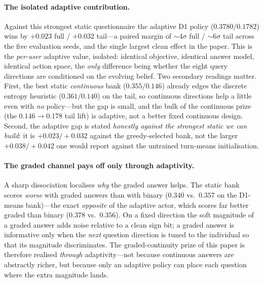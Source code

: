 \documentclass[11pt]{article}
\begin{document}
\paragraph{The isolated adaptive contribution.} Against this strongest static questionnaire the adaptive D1 policy
($0.3780/0.1782$) wins by $+0.023$ full / $+0.032$ tail---a paired margin of ${\sim}4\sigma$ full / ${\sim}6\sigma$ tail
across the five evaluation seeds, and the single largest clean effect in the paper. This is the \emph{per-user} adaptive
value, isolated: identical objective, identical answer model, identical action space, the \emph{only} difference being
whether the eight query directions are conditioned on the evolving belief. Two secondary readings matter. First, the best
static \emph{continuous} bank ($0.355/0.146$) already edges the discrete entropy heuristic ($0.361/0.140$) on the tail,
so continuous directions help a little even with \emph{no} policy---but the gap is small, and the bulk of the continuous
prize (the $0.146\!\to\!0.178$ tail lift) is adaptive, not a better fixed continuous design. Second, the adaptive gap is
stated \emph{honestly against the strongest static we can build}: it is $+0.023/+0.032$ against the greedy-selected bank,
not the larger $+0.038/+0.042$ one would report against the untrained turn-means initialisation.

\paragraph{The graded channel pays off only through adaptivity.} A sharp dissociation localises \emph{why} the graded
answer helps. The static bank scores \emph{worse} with graded answers than with binary ($0.340$ vs.\ $0.357$ on the
D1-means bank)---the exact \emph{opposite} of the adaptive actor, which scores far better graded than binary
($0.378$ vs.\ $0.356$). On a fixed direction the soft magnitude of a graded answer adds noise relative to a clean sign
bit; a graded answer is informative only when the \emph{next} question direction is tuned to the individual so that its
magnitude discriminates. The graded-continuity prize of this paper is therefore realised \emph{through} adaptivity---not
because continuous answers are abstractly richer, but because only an adaptive policy can place each question where the
extra magnitude lands.
\end{document}
